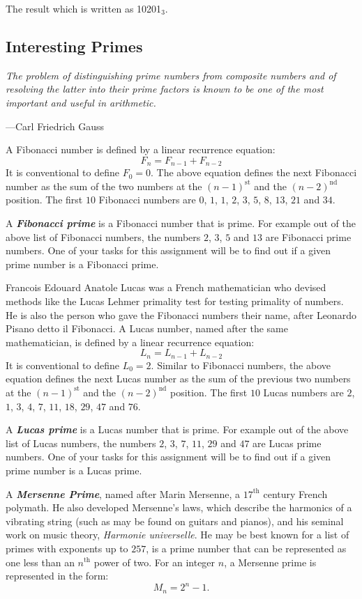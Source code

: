 \documentclass[11pt,twocolumn]{article}
\begin{document}
The result which is written as 10201$_{3}$.


\subsection{Interesting Primes}
\textwidth \epigraph{\emph{The problem of distinguishing
prime numbers from composite numbers and of resolving the latter into their
prime factors is known to be one of the most important and useful in
arithmetic.}}{---Carl Friedrich Gauss}

\noindent A Fibonacci number is defined by a linear recurrence equation:
$$F_n = F_{n-1} + F_{n-2}$$
It is conventional to define $F_0 = 0$. The above equation defines
the next Fibonacci number as the sum of the two numbers at the
$(n-1)^{\text{st}}$ and the $(n-2)^{\text{nd}}$ position. The first
$10$ Fibonacci numbers are $0$, $1$, $1$, $2$, $3$, $5$, $8$, $13$,
$21$ and $34$.

A \textit{\textbf{Fibonacci prime}} is a Fibonacci number that is
prime. For example out of the above list of Fibonacci numbers, the
numbers $2$, $3$, $5$ and $13$ are Fibonacci prime numbers. One of
your tasks for this assignment will be to find out if a given prime
number is a Fibonacci prime.

Francois Edouard Anatole Lucas was a French mathematician who devised
methods like the Lucas Lehmer primality test for testing primality
of numbers. He is also the person who gave the Fibonacci numbers their name, after Leonardo Pisano
detto il Fibonacci.
A Lucas number, named after the same mathematician, is
defined by a linear recurrence equation: $$L_n = L_{n-1} + L_{n-2}$$
It is conventional to define $L_0 = 2$. Similar to Fibonacci numbers,
the above equation defines the next Lucas number as the sum
of the previous two numbers at the $(n-1)^{\text{st}}$ and the
$(n-2)^{\text{nd}}$ position. The first $10$ Lucas numbers are $2$,
$1$, $3$, $4$, $7$, $11$, $18$, $29$, $47$ and $76$.

A \textit{\textbf{Lucas prime}} is a Lucas number that is prime.
For example out of the above list of Lucas numbers, the numbers
$2$, $3$, $7$, $11$, $29$ and $47$ are Lucas prime numbers. One of
your tasks for this assignment will be to find out if a given prime
number is a Lucas prime.

A \textit{\textbf{Mersenne Prime}}, named after Marin Mersenne, a
$17^\text{th}$ century French polymath.
He also developed Mersenne's laws, which describe the harmonics of a vibrating string (such as may
be found on guitars and pianos), and his seminal work on music theory, \emph{Harmonie
universelle}.
He may be best known for a list of primes with
exponents up to $257$, is a prime number that can be represented
as one less than an $n^{\text{th}}$ power of two. For an integer
$n$, a Mersenne prime is represented in the form: $$M_{n} = 2^{n}
- 1.$$
\end{document}
